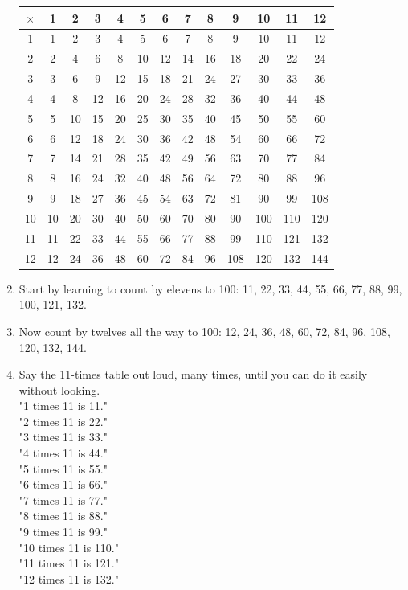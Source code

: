 \documentclass[12pt]{article}
\begin{document}
\begin{enumerate}
\begin{center}
\begin{tabular}{|c||c|c|c|c|c|c|c|c|c|c|c|c|}
\hline
$\times$ & 1 & 2 & 3 & 4 & 5 & 6 & 7 & 8 & 9 & 10 & 11 & 12 \\
\hline\hline
1 & 1 & 2 & 3 & 4 & 5 & 6 & 7 & 8 & 9 & 10 & 11 & 12 \\
2 & 2 & 4 & 6 & 8 & 10 & 12 & 14 & 16 & 18 & 20 & 22 & 24 \\
3 & 3 & 6 & 9 & 12 & 15 & 18 & 21 & 24 & 27 & 30 & 33 & 36 \\
4 & 4 & 8 & 12 & 16 & 20 & 24 & 28 & 32 & 36 & 40 & 44 & 48 \\
5 & 5 & 10 & 15 & 20 & 25 & 30 & 35 & 40 & 45 & 50 & 55 & 60 \\
6 & 6 & 12 & 18 & 24 & 30 & 36 & 42 & 48 & 54 & 60 & 66 & 72 \\
7 & 7 & 14 & 21 & 28 & 35 & 42 & 49 & 56 & 63 & 70 & 77 & 84 \\
8 & 8 & 16 & 24 & 32 & 40 & 48 & 56 & 64 & 72 & 80 & 88 & 96 \\
9 & 9 & 18 & 27 & 36 & 45 & 54 & 63 & 72 & 81 & 90 & 99 & 108 \\
10 & 10 & 20 & 30 & 40 & 50 & 60 & 70 & 80 & 90 & 100 & 110 & 120 \\
11 & 11 & 22 & 33 & 44 & 55 & 66 & 77 & 88 & 99 & 110 & 121 & 132 \\
12 & 12 & 24 & 36 & 48 & 60 & 72 & 84 & 96 & 108 & 120 & 132 & 144 \\
\hline
\end{tabular}
\end{center}

\item Start by learning to count by elevens to 100:
11, 22, 33, 44, 55, 66, 77, 88, 99, 100, 121, 132.\\

\item Now count by twelves all the way to 100:
12, 24, 36, 48, 60, 72, 84, 96, 108, 120, 132, 144.\\

\item Say the 11-times table out loud, many times, until you can do it easily without looking.\\

"1 times 11 is 11."\\
"2 times 11 is 22."\\
"3 times 11 is 33."\\
"4 times 11 is 44."\\
"5 times 11 is 55."\\
"6 times 11 is 66."\\
"7 times 11 is 77."\\
"8 times 11 is 88."\\
"9 times 11 is 99."\\
"10 times 11 is 110."\\
"11 times 11 is 121."\\
"12 times 11 is 132."\\


\end{enumerate}
\end{document}

